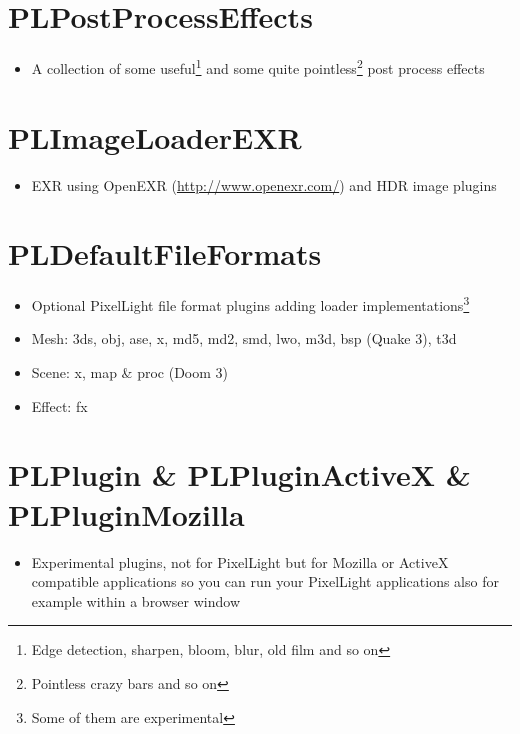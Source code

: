 \section{PLPostProcessEffects}
\begin{itemize}
\item{A collection of some useful\footnote{Edge detection, sharpen, bloom, blur, old film and so on} and some quite pointless\footnote{Pointless crazy bars and so on} post process effects}
\end{itemize}




\section{PLImageLoaderEXR}
\begin{itemize}
\item{EXR using OpenEXR (\url{http://www.openexr.com/}) and HDR image plugins}
\end{itemize}




\section{PLDefaultFileFormats}
\begin{itemize}
\item{Optional PixelLight file format plugins adding loader implementations\footnote{Some of them are experimental}}
\item{Mesh: 3ds, obj, ase, x, md5, md2, smd, lwo, m3d, bsp (Quake 3), t3d}
\item{Scene: x, map \& proc (Doom 3)}
\item{Effect: fx}
\end{itemize}




\section{PLPlugin \& PLPluginActiveX \& PLPluginMozilla}
\begin{itemize}
\item{Experimental plugins, not for PixelLight but for Mozilla or ActiveX compatible applications so you can run your PixelLight applications also for example within a browser window}
\end{itemize}
